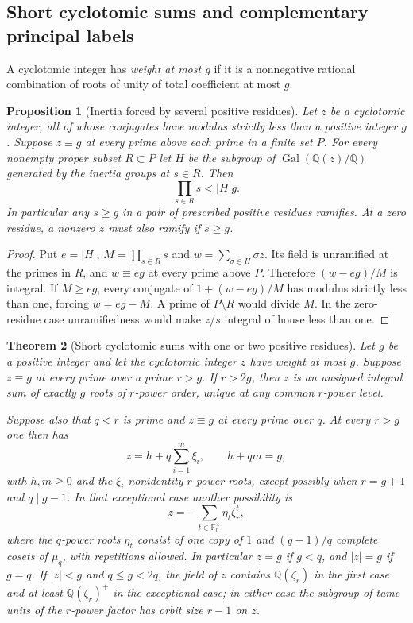 \documentclass[11pt,a4paper]{article}
\numberwithin{equation}{section}
\newtheorem{theorem}{Theorem}[section]
\newtheorem{proposition}[theorem]{Proposition}
\theoremstyle{remark}
\newcommand{\Gal}{\operatorname{Gal}}
\newcommand{\QQ}{\mathbb Q}
\begin{document}
\subsection{Short cyclotomic sums and complementary principal labels}\label{fam:M:sec:4.3}
A cyclotomic integer has \emph{weight at most $g$} if it is a nonnegative rational combination of roots of unity of total coefficient at most $g$.

\begin{proposition}[Inertia forced by several positive residues]\label{fam:M:4.8}
\label{deep:positive-inertia}
Let $z$ be a cyclotomic integer, all of whose conjugates have
modulus strictly less than a positive integer $g$. Suppose $z\equiv g$
at every prime above each prime in a finite set $P$.
For every nonempty proper subset $R\subset P$ let $H$ be the subgroup
of $\Gal(\QQ(z)/\QQ)$ generated by the inertia groups at $s\in R$.
Then
\[
                         \prod_{s\in R}s < |H|g.
\]
In particular any $s\ge g$ in a pair of prescribed positive residues
ramifies. At a zero residue, a nonzero $z$ must also ramify if $s\ge g$.
\end{proposition}
\begin{proof}
Put $e=|H|$, $M=\prod_{s\in R}s$ and $w=\sum_{\sigma\in H}\sigma z$.
Its field is unramified at the primes in $R$, and $w\equiv eg$ at
every prime above $P$. Therefore $(w-eg)/M$ is integral. If $M\ge eg$,
every conjugate of $1+(w-eg)/M$ has modulus strictly less than one,
forcing $w=eg-M$. A prime of $P\setminus R$ would divide $M$.
In the zero-residue case unramifiedness would make $z/s$ integral
of house less than one.
\end{proof}
\begin{theorem}[Short cyclotomic sums with one or two positive residues]\label{fam:M:4.9}\label{first:balance}\label{seq:two-positive}\label{three:word}
Let $g$ be a positive integer and let the cyclotomic integer $z$ have weight at most $g$. Suppose $z\equiv g$ at every prime over a prime $r>g$.
If $r>2g$, then $z$ is an unsigned integral sum of exactly $g$ roots of $r$-power order, unique at any common $r$-power level.

Suppose also that $q<r$ is prime and $z\equiv g$ at every prime over $q$. At every $r>g$ one then has
\[
   z=h+q\sum_{i=1}^m\xi_i,\qquad h+qm=g,
\]
with $h,m\ge0$ and the $\xi_i$ nonidentity $r$-power roots, except possibly when $r=g+1$ and $q\mid g-1$. In that exceptional case another possibility is
\[
   z=-\sum_{t\in\mathbb F_r^\times}\eta_t\zeta_r^t,
\]
where the $q$-power roots $\eta_t$ consist of one copy of $1$ and $(g-1)/q$ complete cosets of $\mu_q$, with repetitions allowed. In particular $z=g$ if $g<q$, and $|z|=g$ if $g=q$. If $|z|<g$ and $q\le g<2q$, the field of $z$ contains $\QQ(\zeta_r)$ in the first case and at least $\QQ(\zeta_r)^+$ in the exceptional case; in either case the subgroup of tame units of the $r$-power factor has orbit size $r-1$ on $z$.
\end{theorem}
\end{document}

